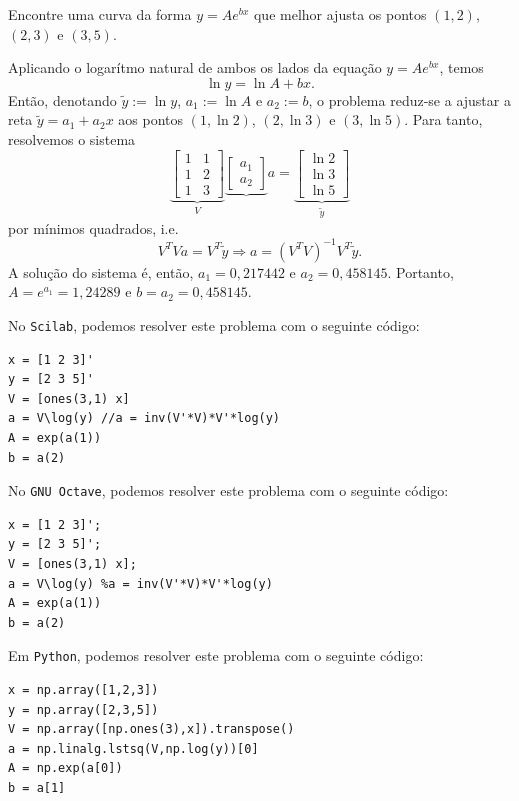 \begin{ex}Encontre uma curva da forma $y=Ae^{bx}$ que melhor ajusta os pontos $(1, 2)$, $(2, 3)$ e $(3, 5)$.
\end{ex}
\begin{sol}
  Aplicando o logarítmo natural de ambos os lados da equação $y=Ae^{bx}$, temos
\begin{equation*}
  \ln y = \ln A + bx.
\end{equation*}
Então, denotando $\tilde{y} := \ln y$, $a_1 := \ln A$ e $a_2 := b$, o problema reduz-se a ajustar a reta $\tilde{y} = a_1 + a_2x$ aos pontos $(1, \ln 2)$, $(2, \ln 3)$ e $(3, \ln 5)$. Para tanto, resolvemos o sistema
\begin{equation*}
  \underbrace{\begin{bmatrix}
    1 & 1\\
    1 & 2\\
    1 & 3
  \end{bmatrix}}_{V}
  \underbrace{\begin{bmatrix}
    a_1\\
    a_2
  \end{bmatrix}}{a} = 
  \underbrace{\begin{bmatrix}
    \ln 2\\
    \ln 3\\
    \ln 5
  \end{bmatrix}}_{\tilde{y}}
\end{equation*}
por mínimos quadrados, i.e. 
\begin{equation*}
 V^TVa = V^T\tilde{y} \Rightarrow a = \left(V^TV\right)^{-1}V^T\tilde{y}.
\end{equation*}
A solução do sistema é, então, $a_1=0,217442$ e $a_2=0,458145$. Portanto, $A=e^{a_1}=1,24289$ e $b=a_2=0,458145$.

\ifisscilab
No \verb+Scilab+, podemos resolver este problema com o seguinte código:
\begin{verbatim}
x = [1 2 3]'
y = [2 3 5]'
V = [ones(3,1) x]
a = V\log(y) //a = inv(V'*V)*V'*log(y)
A = exp(a(1))
b = a(2)
\end{verbatim}
\fi
\ifisoctave
No \verb+GNU Octave+, podemos resolver este problema com o seguinte código:
\begin{verbatim}
x = [1 2 3]';
y = [2 3 5]';
V = [ones(3,1) x];
a = V\log(y) %a = inv(V'*V)*V'*log(y)
A = exp(a(1))
b = a(2)
\end{verbatim}
\fi
\ifispython
Em \verb+Python+, podemos resolver este problema com o seguinte código:
\begin{verbatim}
x = np.array([1,2,3])
y = np.array([2,3,5])
V = np.array([np.ones(3),x]).transpose()
a = np.linalg.lstsq(V,np.log(y))[0]
A = np.exp(a[0])
b = a[1]
\end{verbatim}
\fi
\end{sol}

